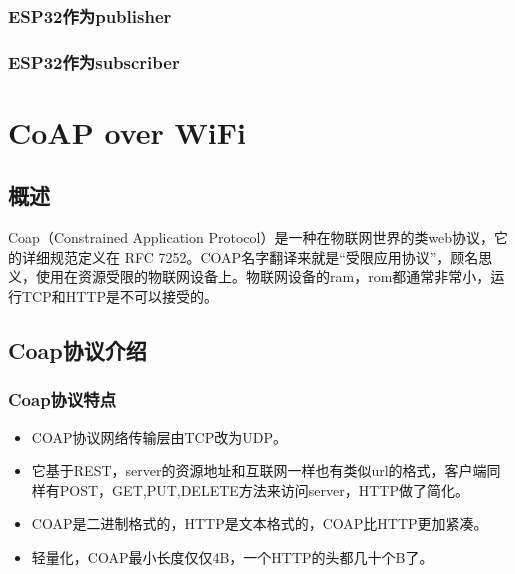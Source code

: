 \documentclass[a4paper,12pt,english]{sphinxmanual}
\begin{document}
{{\subsubsection{ESP32作为publisher}
\label{\detokenize{exp-esp32/mqtt:esp32publisher}}

\subsubsection{ESP32作为subscriber}
\label{\detokenize{exp-esp32/mqtt:esp32subscriber}}
\sphinxstepscope


\section{CoAP over WiFi}
\label{\detokenize{exp-esp32/coap:coap-over-wifi}}\label{\detokenize{exp-esp32/coap::doc}}

\subsection{概述}
\label{\detokenize{exp-esp32/coap:id1}}
\sphinxAtStartPar
Coap（Constrained Application Protocol）是一种在物联网世界的类web协议，它的详细规范定义在 RFC 7252。COAP名字翻译来就是“受限应用协议”，顾名思义，使用在资源受限的物联网设备上。物联网设备的ram，rom都通常非常小，运行TCP和HTTP是不可以接受的。


\subsection{Coap协议介绍}
\label{\detokenize{exp-esp32/coap:coap}}

\subsubsection{Coap协议特点}
\label{\detokenize{exp-esp32/coap:id2}}\begin{itemize}
\item {} 
\sphinxAtStartPar
COAP协议网络传输层由TCP改为UDP。

\item {} 
\sphinxAtStartPar
它基于REST，server的资源地址和互联网一样也有类似url的格式，客户端同样有POST，GET,PUT,DELETE方法来访问server，HTTP做了简化。

\item {} 
\sphinxAtStartPar
COAP是二进制格式的，HTTP是文本格式的，COAP比HTTP更加紧凑。

\item {} 
\sphinxAtStartPar
轻量化，COAP最小长度仅仅4B，一个HTTP的头都几十个B了。


\end{itemize}}}
\end{document}
